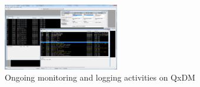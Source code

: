 \begin{figure}
\centering
\includegraphics[width=0.45\textwidth]{figs/QxDM.png}
\caption{Ongoing monitoring and logging activities on QxDM}
\label{fig:qxdm}
\end{figure}

\label{sec:intro}

